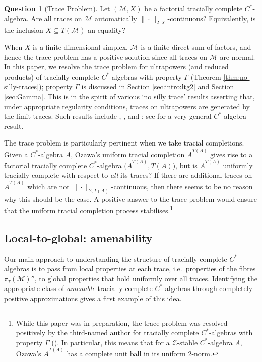 \documentclass[a4paper,11pt]{amsart}
\theoremstyle{definition}
\newtheorem{question}[theorem]{Question}
\numberwithin{equation}{section}
\numberwithin{theorem}{section}
\newcommand{\Z}{\mathcal Z}
\newcommand{\M}{\mathcal{M}}
\newcommand{\completion}[2]{\overline{#1}^{#2}}
\begin{document}
\begin{question}[Trace Problem]\label{Q:traces}
Let $(\M,X)$ be a factorial tracially complete $C^*$-algebra.  Are all traces on $\M$ automatically $\|\cdot\|_{2,X}$-continuous? Equivalently, is the inclusion $X\subseteq T(\M)$ an equality?
\end{question}

When $X$ is a finite dimensional simplex, $\mathcal M$ is a finite direct sum of factors, and hence the trace problem has a positive solution since all traces on $\mathcal M$ are normal.   In this paper, we resolve the trace problem for ultrapowers (and reduced products) of tracially complete $C^*$-algebras with property $\Gamma$ (Theorem \ref{thm:no-silly-traces}); property $\Gamma$ is discussed in Section \ref{sec:intro:ltg2} and Section \ref{sec:Gamma}.  This is in the spirit of various `no silly trace' results asserting that, under appropriate regularity conditions, traces on ultrapowers are generated by the limit traces.  Such results include \cite[Theorem 8]{Oz13}, \cite[Theorem~1.2]{NR16}, and \cite[Theorem~3.22]{BBSTWW}; see \cite[Theorem~A]{APRT23} for a very general $C^*$-algebra result.


The trace problem is particularly pertinent when we take tracial completions.  Given a $C^*$-algebra $A$, Ozawa's uniform tracial completion $\completion{A}{T(A)}$ gives rise to a factorial tracially complete $C^*$-algebra $\big(\completion{A}{T(A)},T(A)\big)$, but is $\completion{A}{T(A)}$ uniformly tracially complete with respect to \emph{all} its traces?  If there are additional traces on $\completion{A}{T(A)}$ which are not $\|\cdot\|_{2,T(A)}$-continuous, then there seems to be no reason why this should be the case.  A positive answer to the trace problem would ensure that the uniform tracial completion process stabilises.\footnote{While this paper was in preparation, the trace problem was resolved positively by the third-named author for tracially complete $C^*$-algebras with property $\Gamma$ (\cite{Ev24}). In particular, this means that for a $\Z$-stable $C^*$-algebra $A$, Ozawa's $\completion{A}{T(A)}$ has a complete unit ball in its uniform 2-norm.}



\subsection{Local-to-global: amenability}\label{Sect:IntroAmenability}

Our main approach to understanding the structure of tracially complete $C^*$-algebras is to pass from local properties at each trace, i.e.\ properties of the fibres $\pi_\tau(\mathcal M)''$, to global properties that hold uniformly over all traces.  Identifying the appropriate class of \emph{amenable} tracially complete $C^*$-algebras through completely positive approximations gives a first example of this idea.
\end{document}
